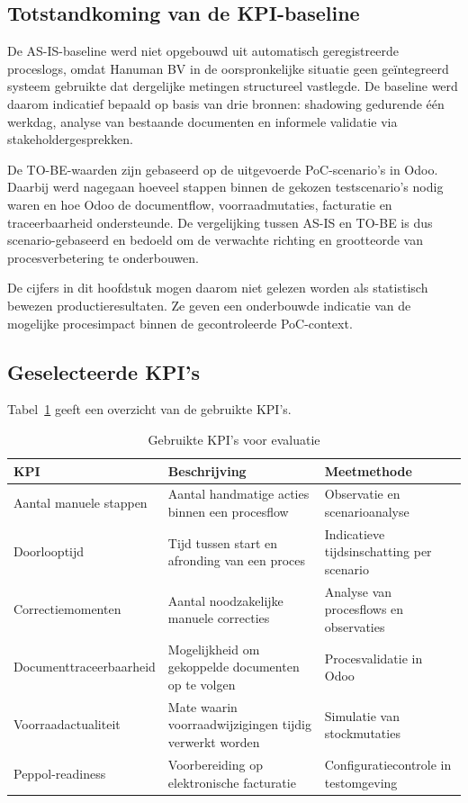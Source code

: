 \subsection{Totstandkoming van de KPI-baseline}

De AS-IS-baseline werd niet opgebouwd uit automatisch geregistreerde proceslogs, omdat Hanuman BV in de oorspronkelijke situatie geen geïntegreerd systeem gebruikte dat dergelijke metingen structureel vastlegde. De baseline werd daarom indicatief bepaald op basis van drie bronnen: shadowing gedurende één werkdag, analyse van bestaande documenten en informele validatie via stakeholdergesprekken.

De TO-BE-waarden zijn gebaseerd op de uitgevoerde PoC-scenario's in Odoo. Daarbij werd nagegaan hoeveel stappen binnen de gekozen testscenario's nodig waren en hoe Odoo de documentflow, voorraadmutaties, facturatie en traceerbaarheid ondersteunde. De vergelijking tussen AS-IS en TO-BE is dus scenario-gebaseerd en bedoeld om de verwachte richting en grootteorde van procesverbetering te onderbouwen.

De cijfers in dit hoofdstuk mogen daarom niet gelezen worden als statistisch bewezen productieresultaten. Ze geven een onderbouwde indicatie van de mogelijke procesimpact binnen de gecontroleerde PoC-context.

\subsection{Geselecteerde KPI's}

Tabel~\ref{tab:kpis} geeft een overzicht van de gebruikte KPI's.

\begin{table}[H]
\centering
\caption{Gebruikte KPI's voor evaluatie}
\label{tab:kpis}
\begin{tabular}{|p{4cm}|p{5cm}|p{4cm}|}
\hline
\textbf{KPI} & \textbf{Beschrijving} & \textbf{Meetmethode} \\
\hline
Aantal manuele stappen & Aantal handmatige acties binnen een procesflow & Observatie en scenarioanalyse \\
\hline
Doorlooptijd & Tijd tussen start en afronding van een proces & Indicatieve tijdsinschatting per scenario \\
\hline
Correctiemomenten & Aantal noodzakelijke manuele correcties & Analyse van procesflows en observaties \\
\hline
Documenttraceerbaarheid & Mogelijkheid om gekoppelde documenten op te volgen & Procesvalidatie in Odoo \\
\hline
Voorraadactualiteit & Mate waarin voorraadwijzigingen tijdig verwerkt worden & Simulatie van stockmutaties \\
\hline
Peppol-readiness & Voorbereiding op elektronische facturatie & Configuratiecontrole in testomgeving \\
\hline
\end{tabular}
\end{table}


